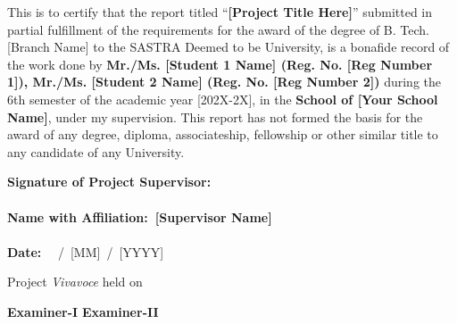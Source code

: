 \documentclass[a4paper, 12pt, oneside]{sastra}
\begin{document}
	
	\certificate
	
	\vspace*{0.5in}
	
	\begin{doublespace}
		\linespread{2}
		
		This is to certify that the report titled ``\textbf{[Project Title Here]}'' submitted in partial fulfillment of the requirements for the award of the degree of B. Tech. [Branch Name] to the SASTRA Deemed to be University, is a bonafide record of the work done by \textbf{Mr./Ms. [Student 1 Name] (Reg. No. [Reg Number 1]), Mr./Ms. [Student 2 Name] (Reg. No. [Reg Number 2]) }  during the 6th semester of the academic year [202X-2X], in the \textbf{School of [Your School Name]}, under my supervision. This report has not formed the basis for the award of any degree, diploma, associateship, fellowship or other similar title to any candidate of any University.
		
	\end{doublespace}
	\vspace*{0.1in}
	
\noindent\textbf{Signature of Project Supervisor:}~	\\ %
\\
\textbf{Name with Affiliation\hspace*{19mm}:~\textbf{[Supervisor Name]}}	\\
\\
	\textbf{Date\hspace*{48.25mm}:}    ~~/~[MM]~/~[YYYY]\\%
	
	\vspace*{0.35in}
	
	\noindent Project \textit{Vivavoce} held on 
	
	\vspace*{0.50in}
	\noindent \textbf{Examiner-I} \hspace*{120mm} \textbf{Examiner-II}
	
	
	\declaration
	
\end{document}
